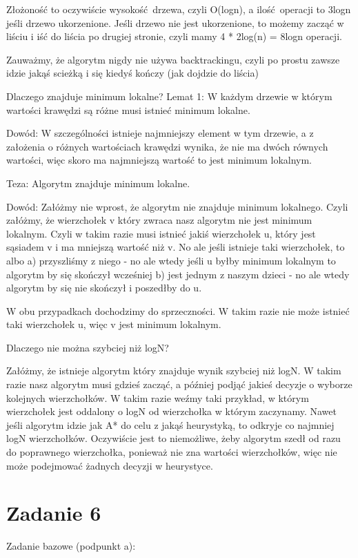 \documentclass[12pt]{article}
\begin{document}
Złożoność to oczywiście wysokość drzewa, czyli O(logn), a ilość operacji to 3logn jeśli drzewo ukorzenione. Jeśli drzewo nie jest ukorzenione, to możemy zacząć w liściu i iść do liścia po drugiej stronie, czyli mamy 4 * 2log(n) = 8logn operacji.

Zauważmy, że algorytm nigdy nie używa backtrackingu, czyli po prostu zawsze idzie jakąś scieżką i się kiedyś kończy (jak dojdzie do liścia)


Dlaczego znajduje minimum lokalne?
Lemat 1:
W każdym drzewie w którym wartości krawędzi są różne musi istnieć minimum lokalne. 

Dowód:
W szczególności istnieje najmniejszy element w tym drzewie, a z założenia o różnych wartościach krawędzi wynika, że nie ma dwóch równych wartości, więc skoro ma najmniejszą wartość to jest minimum lokalnym.


Teza: Algorytm znajduje minimum lokalne.

Dowód:
Załóżmy nie wprost, że algorytm nie znajduje minimum lokalnego. Czyli załóżmy, że wierzchołek v który zwraca nasz algorytm nie jest minimum lokalnym. Czyli w takim razie musi istnieć jakiś wierzchołek u, który jest sąsiadem v i ma mniejszą wartość niż v. No ale jeśli istnieje taki wierzchołek, to albo 
a) przyszliśmy z niego - no ale wtedy jeśli u byłby minimum lokalnym to algorytm by się skończył wcześniej 
b) jest jednym z naszym dzieci - no ale wtedy algorytm by się nie skończył i poszedłby do u.

W obu przypadkach dochodzimy do sprzeczności.
W takim razie nie może istnieć taki wierzchołek u, więc v jest minimum lokalnym.




Dlaczego nie można szybciej niż logN? 

Załóżmy, że istnieje algorytm który znajduje wynik szybciej niż logN. W takim razie nasz algorytm musi gdzieś zacząć, a później podjąć jakieś decyzje o wyborze kolejnych wierzchołków. W takim razie weźmy taki przykład, w którym wierzchołek jest oddalony o logN od wierzchołka w którym zaczynamy. Nawet jeśli algorytm idzie jak A* do celu z jakąś heurystyką, to odkryje co najmniej logN wierzchołków. Oczywiście jest to niemożliwe, żeby algorytm szedł od razu do poprawnego wierzchołka, ponieważ nie zna wartości wierzchołków, więc nie może podejmować żadnych decyzji w heurystyce.


\section{Zadanie 6}
Zadanie bazowe (podpunkt a):\\
\end{document}
